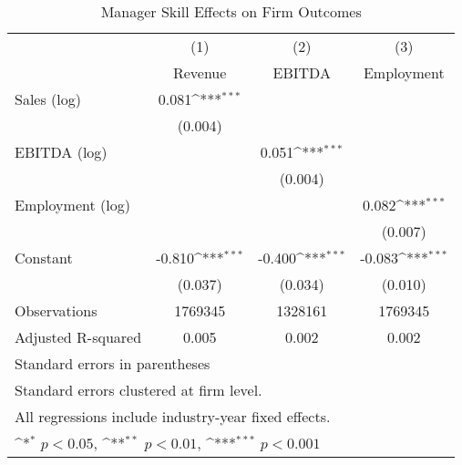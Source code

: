 \begin{table}[htbp]\centering
\def\sym#1{\ifmmode^{#1}\else\(^{#1}\)\fi}
\caption{Manager Skill Effects on Firm Outcomes}
\begin{tabular}{l*{3}{c}}
\toprule
                    &\multicolumn{1}{c}{(1)}&\multicolumn{1}{c}{(2)}&\multicolumn{1}{c}{(3)}\\
                    &\multicolumn{1}{c}{Revenue}&\multicolumn{1}{c}{EBITDA}&\multicolumn{1}{c}{Employment}\\
\midrule
Sales (log)         &       0.081\sym{***}&                     &                     \\
                    &     (0.004)         &                     &                     \\
\addlinespace
EBITDA (log)        &                     &       0.051\sym{***}&                     \\
                    &                     &     (0.004)         &                     \\
\addlinespace
Employment (log)    &                     &                     &       0.082\sym{***}\\
                    &                     &                     &     (0.007)         \\
\addlinespace
Constant            &      -0.810\sym{***}&      -0.400\sym{***}&      -0.083\sym{***}\\
                    &     (0.037)         &     (0.034)         &     (0.010)         \\
\midrule
Observations        &     1769345         &     1328161         &     1769345         \\
Adjusted R-squared  &       0.005         &       0.002         &       0.002         \\
\bottomrule
\multicolumn{4}{l}{\footnotesize Standard errors in parentheses}\\
\multicolumn{4}{l}{\footnotesize Standard errors clustered at firm level.}\\
\multicolumn{4}{l}{\footnotesize All regressions include industry-year fixed effects.}\\
\multicolumn{4}{l}{\footnotesize \sym{*} \(p<0.05\), \sym{**} \(p<0.01\), \sym{***} \(p<0.001\)}\\
\end{tabular}
\end{table}
